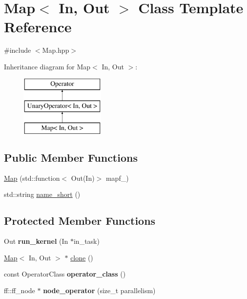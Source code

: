 \hypertarget{class_map}{\section{\-Map$<$ \-In, \-Out $>$ \-Class \-Template \-Reference}
\label{class_map}
}


{\ttfamily \#include $<$\-Map.\-hpp$>$}

\-Inheritance diagram for \-Map$<$ \-In, \-Out $>$\-:\begin{figure}[H]
\begin{center}
\leavevmode
\includegraphics[height=3.000000cm]{class_map}
\end{center}
\end{figure}
\subsection*{\-Public \-Member \-Functions}
\begin{DoxyCompactItemize}
\item 
\hyperlink{class_map_a592d69e973dc2596ab688914fb7f5f65}{\-Map} (std\-::function$<$ \-Out(\-In)$>$ mapf\-\_\-)
\item 
std\-::string \hyperlink{class_map_a0ac45a1807983af02472c0a01994bf61}{name\-\_\-short} ()
\end{DoxyCompactItemize}
\subsection*{\-Protected \-Member \-Functions}
\begin{DoxyCompactItemize}
\item 
\hypertarget{class_map_ae61a30423820caac53954f22c5935580}{\-Out {\bfseries run\-\_\-kernel} (\-In $\ast$in\-\_\-task)}\label{class_map_ae61a30423820caac53954f22c5935580}

\item 
\hyperlink{class_map}{\-Map}$<$ \-In, \-Out $>$ $\ast$ \hyperlink{class_map_a0524200b07c1713bc9f3dd60b372b30c}{clone} ()
\item 
\hypertarget{class_map_a5c9fcf56ffe1fd40d3642bcfc561844a}{const \-Operator\-Class {\bfseries operator\-\_\-class} ()}\label{class_map_a5c9fcf56ffe1fd40d3642bcfc561844a}

\item 
\hypertarget{class_map_a0f944d351539f338ce7eda5cc42f41cc}{ff\-::ff\-\_\-node $\ast$ {\bfseries node\-\_\-operator} (size\-\_\-t parallelism)}\label{class_map_a0f944d351539f338ce7eda5cc42f41cc}

\end{DoxyCompactItemize}
